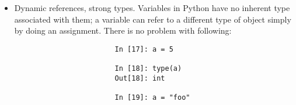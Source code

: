 \documentclass{article}
\newtheorem{remark}{Remark}
\begin{document}
\begin{enumerate}
\begin{itemize}
\begin{itemize}
\begin{itemize}
\begin{itemize}
					-- Hiểu được ngữ nghĩa của các tham chiếu trong Python, \& khi nào, như thế nào, \& lý do tại sao dữ liệu được sao chép, đặc biệt quan trọng khi bạn làm việc với các tập dữ liệu lớn hơn trong Python.					
					\begin{remark}
						Assignment is also referred to as {\rm binding}, as we are binding a name to an object. Variable names that have been assigned may occasionally be referred to as bound variables.
					\end{remark}
					When pass objects as arguments to a function, new local variables are created referencing original objects without any copying. If bind a new object to a variable inside a function, that will not overwrite a variable of same name in ``scope'' outside of function (``parent scope''). Therefore possible to alter internals of a mutable argument. Suppose had following function:
					\begin{verbatim}
						In [13]: def append_element(some_list, element):
						   ....:     some_list.append(element)
					\end{verbatim}
					Then have:
					\begin{verbatim}
						In [14]: data = [1, 2, 3]
						
						In [15]: append_element(data, 4)
						
						In [16]: data
						Out[16]: [1, 2, 3, 4]
					\end{verbatim}
					\item {\sf Dynamic references, strong types.} Variables in Python have no inherent type associated with them; a variable can refer to a different type of object simply by doing an assignment. There is no problem with following:
					\begin{verbatim}
						In [17]: a = 5
						
						In [18]: type(a)
						Out[18]: int
						
						In [19]: a = "foo"
						

\end{verbatim}
\end{itemize}
\end{itemize}
\end{itemize}
\end{itemize}
\end{enumerate}
\end{document}
